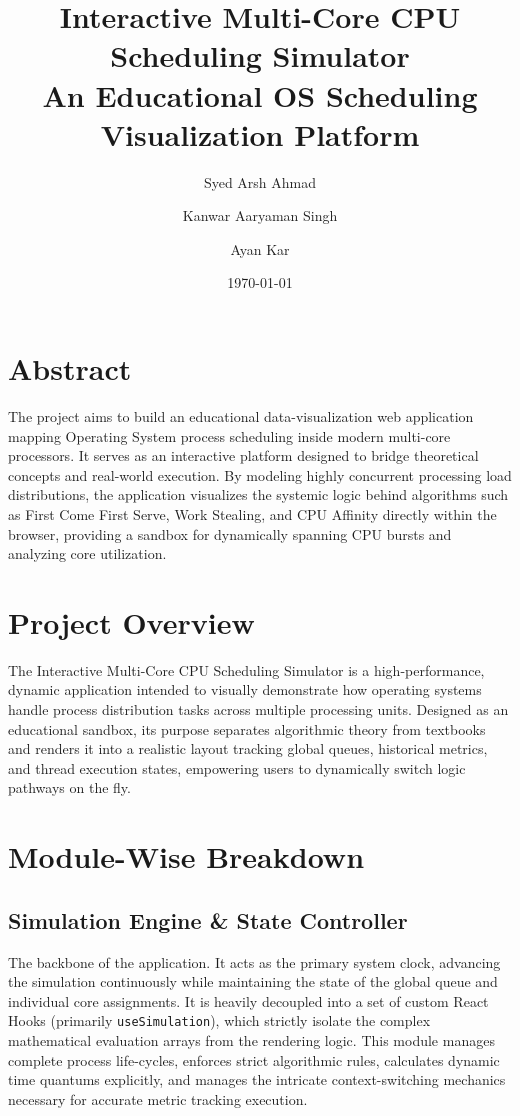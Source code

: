 \documentclass[a4paper]{article}
\begin{document}
\title{\vspace{-2cm}Interactive Multi-Core CPU Scheduling Simulator \\
\large An Educational OS Scheduling Visualization Platform}
\author{Syed Arsh Ahmad \and Kanwar Aaryaman Singh \and Ayan Kar}
\date{\today}

\maketitle

\section*{Abstract}
The project aims to build an educational data-visualization web application mapping Operating System process scheduling inside modern multi-core processors. It serves as an interactive platform designed to bridge theoretical concepts and real-world execution. By modeling highly concurrent processing load distributions, the application visualizes the systemic logic behind algorithms such as First Come First Serve, Work Stealing, and CPU Affinity directly within the browser, providing a sandbox for dynamically spanning CPU bursts and analyzing core utilization.

\section{Project Overview}
The Interactive Multi-Core CPU Scheduling Simulator is a high-performance, dynamic application intended to visually demonstrate how operating systems handle process distribution tasks across multiple processing units. Designed as an educational sandbox, its purpose separates algorithmic theory from textbooks and renders it into a realistic layout tracking global queues, historical metrics, and thread execution states, empowering users to dynamically switch logic pathways on the fly. 

\section{Module-Wise Breakdown}

\subsection{Simulation Engine \& State Controller}
The backbone of the application. It acts as the primary system clock, advancing the simulation continuously while maintaining the state of the global queue and individual core assignments. It is heavily decoupled into a set of custom React Hooks (primarily \texttt{useSimulation}), which strictly isolate the complex mathematical evaluation arrays from the rendering logic. This module manages complete process life-cycles, enforces strict algorithmic rules, calculates dynamic time quantums explicitly, and manages the intricate context-switching mechanics necessary for accurate metric tracking execution.
\end{document}

